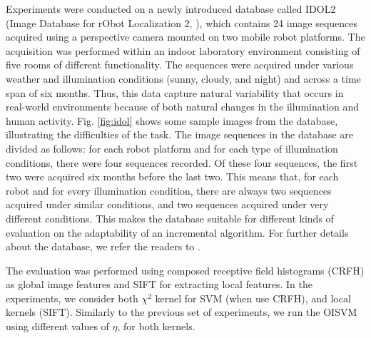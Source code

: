 Experiments were conducted on  a newly introduced database called IDOL2 
(Image Database for rObot Localization 2, \cite{luo:idol2}), 
which contains 24 image sequences acquired using a perspective
camera mounted on two mobile robot platforms. The acquisition was
performed within an indoor laboratory environment consisting of five 
rooms of different functionality. The sequences were acquired under
various weather and illumination conditions (sunny, cloudy, and night)
and across a time span of six months. Thus, this data capture natural
variability that occurs in real-world environments because of both 
natural changes in the illumination and human activity. Fig. \ref{fig:idol} 
shows some sample images from the database, illustrating the difficulties of
the task.
The image sequences in the database are divided as follows: for each robot
platform and for each type of illumination conditions, there were
four sequences recorded. Of these four sequences, the first two were 
acquired six months before the last two. This means that, for each robot
and for every illumination condition, there are always two sequences
acquired under similar conditions, and two sequences acquired under very
different conditions. This makes the database suitable for different kinds of
evaluation on the adaptability of an incremental algorithm. For further
details about the database, we refer the readers to \cite{luo:idol2}.

The evaluation was performed using composed receptive field histograms (CRFH)
\cite{linde:icpr04} as global image features and SIFT \cite{lowe99object} for
extracting local features. In the experiments, we consider both $\chi^2$ kernel
for SVM (when use CRFH), and local kernels \cite{wallraven:iccv03} (SIFT).
Similarly to the previous set of experiments, we run the OISVM using different
values of $\eta$, for both kernels.

